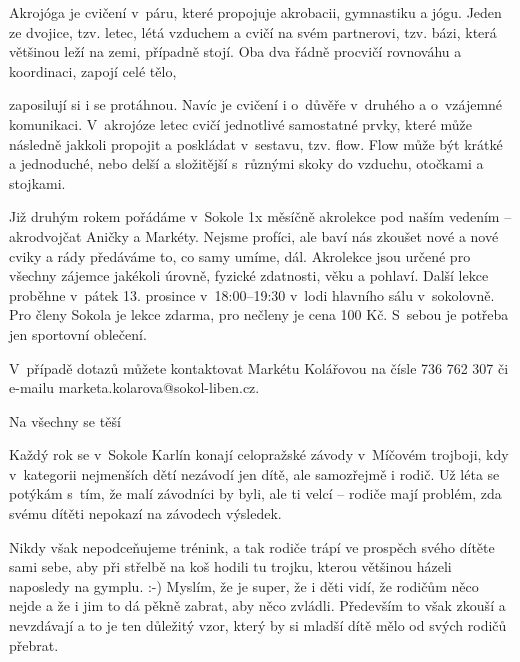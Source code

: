 \documentclass[11pt]{article}
\begin{document}
Akrojóga je cvičení v~páru, které propojuje akrobacii, gymnastiku a jógu. Jeden ze dvojice, tzv. letec, létá vzduchem a cvičí na svém partnerovi, tzv. bázi, která většinou leží na zemi, případně stojí. Oba dva řádně procvičí rovnováhu a koordinaci, zapojí celé tělo,

zaposilují si i se protáhnou. Navíc je cvičení i o~důvěře v~druhého a o~vzájemné komunikaci. V~akrojóze letec cvičí jednotlivé samostatné prvky, které může následně jakkoli propojit a poskládat v~sestavu, tzv. flow. Flow může být krátké a jednoduché, nebo delší a složitější s~různými skoky do vzduchu, otočkami a stojkami.

Již druhým rokem pořádáme v~Sokole 1x měsíčně akrolekce pod naším vedením – akrodvojčat Aničky a Markéty. Nejsme profíci, ale baví nás zkoušet nové a nové cviky a rády předáváme to, co samy umíme, dál. Akrolekce jsou určené pro všechny zájemce jakékoli úrovně, fyzické zdatnosti, věku a pohlaví. Další lekce proběhne v~pátek 13. prosince v~18:00–19:30 v~lodi hlavního sálu v~sokolovně. Pro členy Sokola je lekce zdarma, pro nečleny je cena 100 Kč. S~sebou je potřeba jen sportovní oblečení.

V~případě dotazů můžete kontaktovat Markétu Kolářovou na čísle 736 762 307 či e-mailu marketa.kolarova@sokol-liben.cz.

Na všechny se těší

\signature{Anička a Markéta}{}


Každý rok se v~Sokole Karlín konají celopražské závody v~Míčovém trojboji, kdy v~kategorii nejmenších dětí nezávodí jen dítě, ale samozřejmě i rodič. Už léta se potýkám s~tím, že malí závodníci by byli, ale ti velcí – rodiče mají problém, zda svému dítěti nepokazí na závodech výsledek.

Nikdy však nepodceňujeme trénink, a tak rodiče trápí ve prospěch svého dítěte sami sebe, aby při střelbě na koš hodili tu trojku, kterou většinou házeli naposledy na gymplu. :-) Myslím, že je super, že i děti vidí, že rodičům něco nejde a že i jim to dá pěkně zabrat, aby něco zvládli. Především to však zkouší a nevzdávají a to je ten důležitý vzor, který by si mladší dítě mělo od svých rodičů přebrat. 
\end{document}
